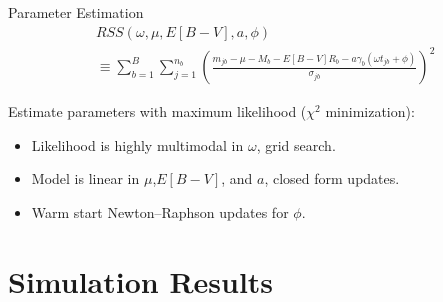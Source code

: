 \documentclass[12pt]{beamer}
\begin{document}
\begin{frame}{Parameter Estimation}
\begin{align*}
&RSS(\omega,\mu,E[B-V],a,\phi) \\
 &\equiv\sum_{b=1}^B \sum_{j=1}^{n_b}\left(\frac{m_{jb} - \mu - M_b - E[B-V]R_b - a\gamma_b(\omega t_{jb} + \phi)}{\sigma_{jb}}\right)^2
\end{align*}


Estimate parameters with maximum likelihood ($\chi^2$ minimization):
\begin{itemize}
\item Likelihood is highly multimodal in $\omega$, grid search.
\item Model is linear in $\mu$,$E[B-V]$, and $a$, closed form updates.
\item Warm start Newton--Raphson updates for $\phi$.
\end{itemize}

\end{frame}

\section{Simulation Results}
\end{document}
